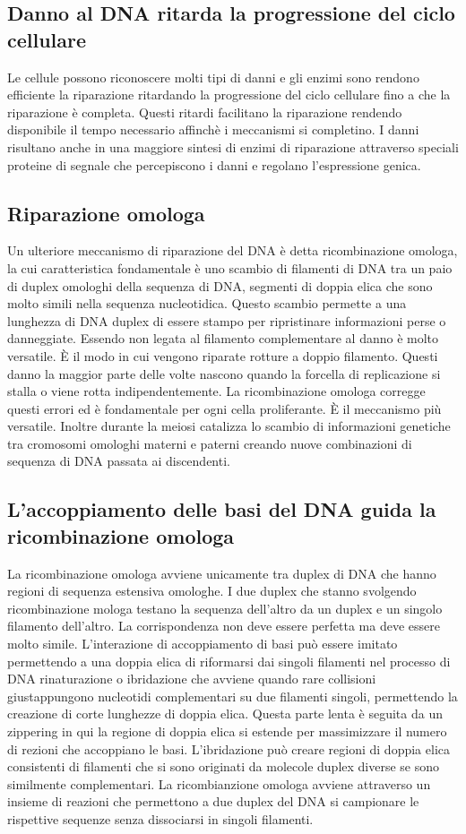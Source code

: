 \subsection{Danno al DNA ritarda la progressione del ciclo cellulare}
Le cellule possono riconoscere molti tipi di danni e gli enzimi sono rendono efficiente la riparazione ritardando la progressione del ciclo cellulare fino a che la riparazione \`e 
completa. Questi ritardi facilitano la riparazione rendendo disponibile il tempo necessario affinch\`e i meccanismi si completino. I danni risultano anche in una maggiore sintesi di 
enzimi di riparazione attraverso speciali proteine di segnale che percepiscono i danni e regolano l'espressione genica. 
\subsection{Riparazione omologa}
Un ulteriore meccanismo di riparazione del DNA \`e detta ricombinazione omologa, la cui caratteristica fondamentale \`e uno scambio di filamenti di DNA tra un paio di duplex omologhi
della sequenza di DNA, segmenti di doppia elica che sono molto simili nella sequenza nucleotidica. Questo scambio permette a una lunghezza di DNA duplex di essere stampo per 
ripristinare informazioni perse o danneggiate. Essendo non legata al filamento complementare al danno \`e molto versatile. \`E il modo in cui vengono riparate rotture a doppio filamento.
Questi danno la maggior parte delle volte nascono quando la forcella di replicazione si stalla o viene rotta indipendentemente. La ricombinazione omologa corregge questi errori ed \`e
fondamentale per ogni cella proliferante. \`E il meccanismo pi\`u versatile. Inoltre durante la meiosi catalizza lo scambio di informazioni genetiche tra cromosomi omologhi materni e 
paterni creando nuove combinazioni di sequenza di DNA passata ai discendenti. 
\subsection{L'accoppiamento delle basi del DNA guida la ricombinazione omologa}
La ricombinazione omologa avviene unicamente tra duplex di DNA che hanno regioni di sequenza estensiva omologhe. I due duplex che stanno svolgendo ricombinazione mologa testano la 
sequenza dell'altro  da un duplex e un singolo filamento dell'altro. La corrispondenza non deve essere perfetta ma deve essere molto simile. L'interazione di accoppiamento di basi
pu\`o essere imitato permettendo a una doppia elica di riformarsi dai singoli filamenti nel processo di DNA rinaturazione o ibridazione che avviene quando rare collisioni giustappungono
nucleotidi complementari su due filamenti singoli, permettendo la creazione di corte lunghezze di doppia elica. Questa parte lenta \`e seguita da un zippering in qui la regione di doppia
elica si estende per massimizzare il numero di rezioni che accoppiano le basi. L'ibridazione pu\`o creare regioni di doppia elica consistenti di filamenti che si sono originati da 
molecole duplex diverse se sono similmente complementari. La ricombianzione omologa avviene attraverso un insieme di reazioni che permettono a due duplex del DNA si campionare le 
rispettive sequenze senza dissociarsi in singoli filamenti. 
